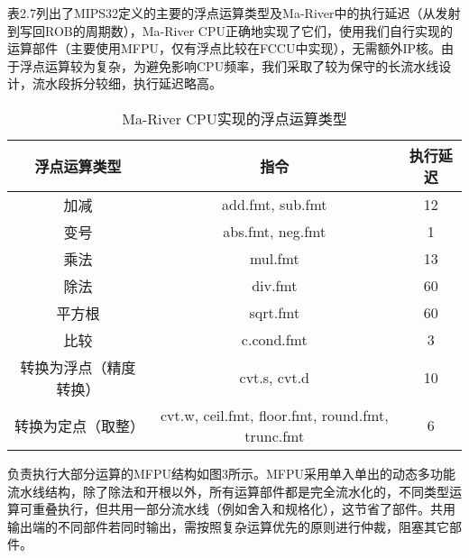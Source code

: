表2.7列出了MIPS32定义的主要的浮点运算类型及Ma-River中的执行延迟（从发射到写回ROB的周期数），Ma-River CPU正确地实现了它们，使用我们自行实现的运算部件（主要使用MFPU，仅有浮点比较在FCCU中实现），无需额外IP核。由于浮点运算较为复杂，为避免影响CPU频率，我们采取了较为保守的长流水线设计，流水段拆分较细，执行延迟略高。

\begin{table}[htbp]
\centering
\caption{Ma-River CPU实现的浮点运算类型}
    \label{fig:enter-label}
\begin{tabular}{c|c|c}
\hline  %
\textbf{浮点运算类型} & \textbf{指令} & \textbf{执行延迟}\\
\hline
加减 & add.fmt, sub.fmt & 12\\
变号 & abs.fmt, neg.fmt & 1\\
乘法 & mul.fmt & 13\\
除法 & div.fmt & 60\\
平方根 & sqrt.fmt & 60\\
比较 & c.cond.fmt & 3\\
转换为浮点（精度转换） & cvt.s, cvt.d & 10\\
转换为定点（取整） & cvt.w, ceil.fmt, floor.fmt, round.fmt, trunc.fmt & 6\\
\hline
\end{tabular}

\end{table}

负责执行大部分运算的MFPU结构如图3所示。MFPU采用单入单出的动态多功能流水线结构，除了除法和开根以外，所有运算部件都是完全流水化的，不同类型运算可重叠执行，但共用一部分流水线（例如舍入和规格化），这节省了部件。共用输出端的不同部件若同时输出，需按照复杂运算优先的原则进行仲裁，阻塞其它部件。

